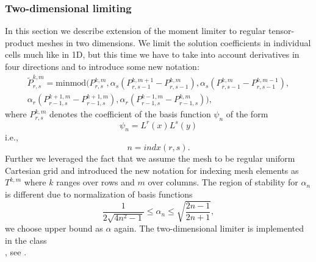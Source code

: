 \subsubsection{Two-dimensional limiting}
In this section we describe extension of the moment limiter to regular
tensor-product meshes in two dimensions. We limit the solution coefficients in
individual cells much like in 1D, but this time we have to take into account
derivatives in four directions and to introduce some new notation:
\begin{multline}
\tilde{P}^{k,m}_{r,s} =
\text{minmod}\big(P^{k,m}_{r,s},
\alpha_s(P^{k,m+1}_{r,s-1} - P^{k,m}_{r,s-1}),
\alpha_s(P^{k,m}_{r,s-1} - P^{k,m-1}_{r,s-1}),\\
\alpha_r(P^{k+1,m}_{r-1,s} - P^{k+1,m}_{r-1,s}),
\alpha_r(P^{k-1,m}_{r-1,s} - P^{k,m}_{r-1,s})\big),
\end{multline}
where $P^{k, m}_{r,s}$ denotes the coefficient of the basis function $\psi_n$ of the form
$$
\psi_n = L^r(x)L^s(y)
$$
i.e.,
$$
n = indx(r, s).
$$
Further we leveraged the fact that we assume the mesh to be regular uniform
Cartesian grid and introduced the new notation for indexing mesh elements as $T^{k,m}$ where $k$
ranges over rows and $m$ over columns. The region of stability for $\alpha_n$ is
different due to normalization of basis functions
\begin{equation}
\frac{1}{2\sqrt{4n^2 - 1}} \leq \alpha_n \leq \sqrt{\frac{2n - 1}{2n + 1}},
\end{equation}
we choose upper bound as $\alpha$ again. The two-dimensional limiter is
implemented in the
class\\ , see .



